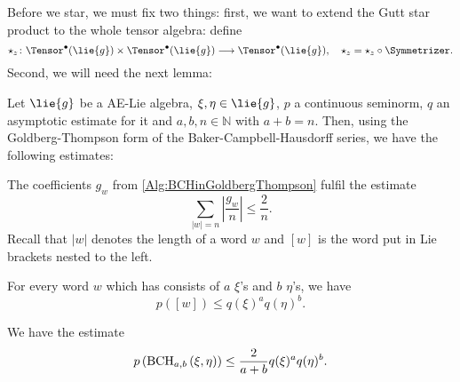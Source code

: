 Before we star, we must fix two things: first, we want to extend the Gutt star 
product to the whole tensor algebra: define
\begin{equation*}
	\ostar_z
	\colon
	\Tensor^{\bullet}(\lie{g})
	\times
	\Tensor^{\bullet}(\lie{g})
	\longrightarrow
	\Tensor^{\bullet}(\lie{g})
	, \quad
	\ostar_z 
	= 
	\star_z \circ \Symmetrizer.
\end{equation*}
Second, we will need the next lemma:
\begin{lemma}
	\label{LCAna:Lemma:BCHTermsEstiamte}
	Let $\lie{g}$ be a AE-Lie algebra, $\xi, \eta \in \lie{g}$, $p$ a 
	continuous seminorm, $q$ an	asymptotic estimate for it and $a, b, n \in 
	\mathbb{N}$ with $a + b = n$. Then, using the Goldberg-Thompson form of 
	the Baker-Campbell-Hausdorff series, we have the following estimates:
	\begin{lemmalist}
	  \item \label{Item:ThompsonEstimate}
		The coefficients $g_w$ from \eqref{Alg:BCHinGoldbergThompson} 
		fulfil the estimate
		\begin{equation}
			\label{LCAna:ThompsonEstimate}
			\sum\limits_{|w| = n}
			\left| \frac{g_w}{n} \right|
			\leq
			\frac{2}{n}.
		\end{equation}
		Recall that $|w|$ denotes the length of a word $w$ and $[w]$ is the
		word put in Lie brackets nested to  the left.
	\item \label{Item:AEonWords}
		For every word $w$ which has consists of $a$ $\xi$'s and $b$ $\eta$'s,
		we have
		\begin{equation}
		\label{LCAna:AEonWords}
			p([w])
			\leq
			q(\xi)^a q(\eta)^b.
		\end{equation}
	\item \label{Item:BCHEstimate}
		We have the estimate
		\begin{equation}
		\label{LCAna:BCHEstimate}
			p \left(
				\mathrm{BCH}_{a, b}\left(\xi, \eta\right)
			\right)
			\leq
			\frac{2}{a + b}
			q(\xi)^a q(\eta)^b.
		\end{equation}
	\end{lemmalist}
\end{lemma}
